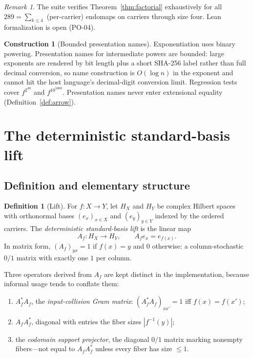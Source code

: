 \documentclass[11pt]{amsart}
\theoremstyle{definition}
\newtheorem{definition}[theorem]{Definition}
\newtheorem{construction}[theorem]{Construction}
\theoremstyle{remark}
\newtheorem{remark}[theorem]{Remark}
\begin{document}
\begin{remark}
The suite verifies Theorem~\ref{thm:factorial} exhaustively for all $289=\sum_{k\le 4}$ (per-carrier) endomaps on carriers through size four. Lean formalization is open (PO-04).
\end{remark}

\begin{construction}[Bounded presentation names]\label{con:names}
Exponentiation uses binary powering. Presentation names for intermediate powers are bounded: large exponents are rendered by bit length plus a short SHA-256 label rather than full decimal conversion, so name construction is $O(\log n)$ in the exponent and cannot hit the host language's decimal-digit conversion limit. Regression tests cover $f^{2^{30}}$ and $f^{10^{5000}}$. Presentation names never enter extensional equality (Definition~\ref{def:arrow}).
\end{construction}

\section{The deterministic standard-basis lift}\label{sec:lift}

\subsection{Definition and elementary structure}

\begin{definition}[Lift]\label{def:lift}
For $f:X\to Y$, let $H_X$ and $H_Y$ be complex Hilbert spaces with orthonormal bases $(e_x)_{x\in X}$ and $(e_y)_{y\in Y}$ indexed by the ordered carriers. The \emph{deterministic standard-basis lift} is the linear map
\[
A_f:H_X\to H_Y,\qquad A_fe_x=e_{f(x)} .
\]
In matrix form, $(A_f)_{yx}=1$ if $f(x)=y$ and $0$ otherwise: a column-stochastic $0/1$ matrix with exactly one $1$ per column.
\end{definition}

Three operators derived from $A_f$ are kept distinct in the implementation, because informal usage tends to conflate them:

\begin{enumerate}
\item $A_f^{*}A_f$, the \emph{input-collision Gram matrix}: $(A_f^*A_f)_{x x'}=1$ iff $f(x)=f(x')$;
\item $A_fA_f^{*}$, diagonal with entries the fiber sizes $|f^{-1}(y)|$;
\item the \emph{codomain support projector}, the diagonal $0/1$ matrix marking nonempty fibers---not equal to $A_fA_f^{*}$ unless every fiber has size $\le 1$.
\end{enumerate}
\end{document}
